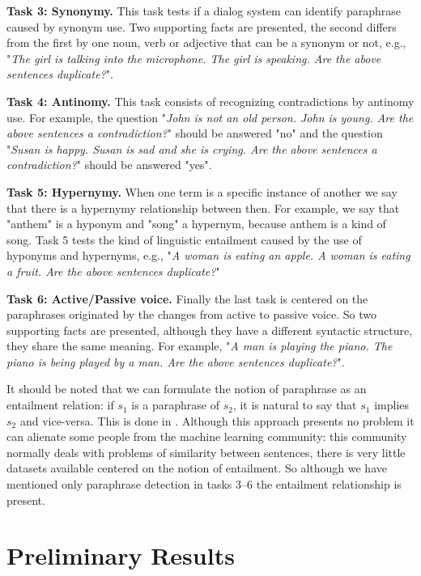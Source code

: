 \textbf{Task 3: Synonymy.} This task tests if a dialog system can identify paraphrase caused by synonym use. Two supporting facts are presented, the second differs from the first by one noun, verb or adjective that can be a synonym or not, e.g., "\textit{The girl is talking into the microphone. The girl is speaking. Are the above sentences duplicate?}".   


\textbf{Task 4: Antinomy.} This task consists of recognizing contradictions by antinomy use. For example, the question "\textit{John is not an old person. John is young. Are the above sentences a contradiction?}" should be answered "no" and the question "\textit{Susan is happy. Susan is sad and she is crying. Are the above sentences a contradiction?}" should be answered "yes".

\textbf{Task 5: Hypernymy.} When one term is a specific instance of another we say that there is a hypernymy relationship between then. For example, we say that "anthem" is a hyponym and "song" a hypernym, because anthem is a kind of song. Task 5 tests the kind of linguistic entailment caused by the use of hyponyms and hypernyms, e.g., "\textit{A woman is eating an apple. A woman is eating a fruit. Are the above sentences duplicate?}"

\textbf{Task 6: Active/Passive voice.} Finally the last task is centered on the paraphrases originated by the changes from active to passive voice. So two supporting facts are presented, although they have a different syntactic structure, they share the same meaning. For example,  "\textit{A man is playing the piano. The piano is being played by a man. Are the above sentences duplicate?}".

It should be noted that we can formulate the notion of paraphrase as an entailment relation: if $s_1$ is a paraphrase of $s_2$, it is natural to say that $s_1$ implies $s_2$ and vice-versa. This is done in \cite{Marelli14}. Although this approach presents no problem it can alienate some people from the machine learning community: this community normally deals  with problems of similarity between sentences, there is very little datasets available centered on the notion of entailment. So although we have mentioned only paraphrase detection in tasks 3--6 the entailment relationship is present.


\section{Preliminary Results}
\label{ch:03-PreliminaryResults}


